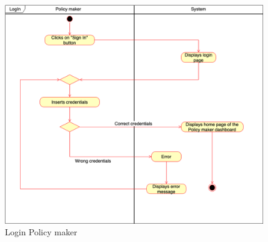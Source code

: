     \begin{figure}[h!]
        \centering
        \includegraphics[scale=0.35]{images/use_cases_diagram/policymaker_login.png}
        \caption{Login Policy maker}
        \label{fig:policymaker_login}
    \end{figure}
    \FloatBarrier
    
